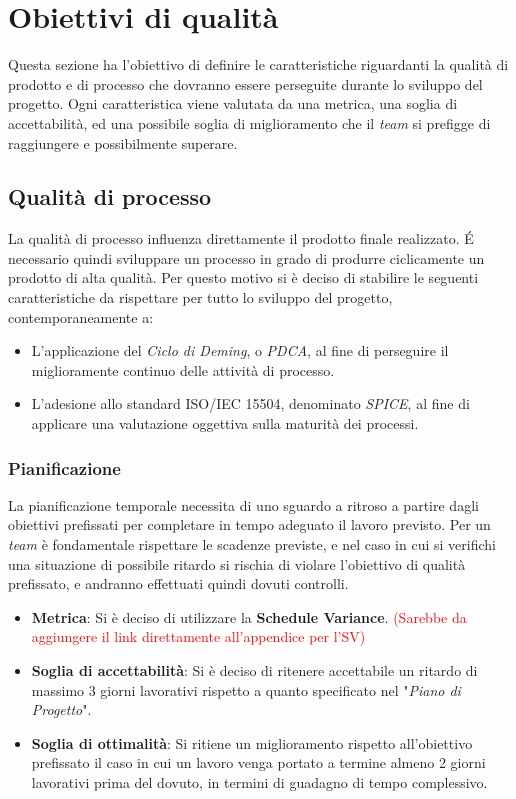 \section{Obiettivi di qualità}
Questa sezione ha l'obiettivo di definire le caratteristiche riguardanti la qualità di prodotto e di processo che dovranno essere perseguite durante lo sviluppo del progetto.
Ogni caratteristica viene valutata da una metrica, una soglia di accettabilità, ed una possibile soglia di miglioramento che il \emph{team} si prefigge di raggiungere e possibilmente superare.

\subsection{Qualità di processo}
La qualità di processo influenza direttamente il prodotto finale realizzato. É necessario quindi sviluppare un processo in grado di produrre ciclicamente un prodotto di alta qualità. Per questo motivo si è deciso di stabilire le seguenti caratteristiche da rispettare per tutto lo sviluppo del progetto, contemporaneamente a:
\begin{itemize}
\item L'applicazione del \emph{Ciclo di Deming}, o \emph{PDCA}, al fine di perseguire il miglioramente continuo delle attività di processo.
\item L'adesione allo standard ISO/IEC 15504, denominato \emph{SPICE}, al fine di applicare una valutazione oggettiva sulla maturità dei processi.
\end{itemize} 

\subsubsection{Pianificazione}
La pianificazione temporale necessita di uno sguardo a ritroso a partire dagli obiettivi prefissati per completare in tempo adeguato il lavoro previsto. Per un \emph{team} è fondamentale rispettare le scadenze previste, e nel caso in cui si verifichi una situazione di possibile ritardo si rischia di violare l'obiettivo di qualità prefissato, e andranno effettuati quindi dovuti controlli.
\begin{itemize}
	\item \textbf{Metrica}: Si è deciso di utilizzare la \textbf{Schedule Variance}. \textcolor{red}{(Sarebbe da aggiungere il link direttamente all'appendice per l'SV)}
	\item \textbf{Soglia di accettabilità}: Si è deciso di ritenere accettabile un ritardo di massimo 3 giorni lavorativi rispetto a quanto specificato nel "\emph{Piano di Progetto}".
	\item \textbf{Soglia di ottimalità}: Si ritiene un miglioramento rispetto all'obiettivo prefissato il caso in cui un lavoro venga portato a termine almeno 2 giorni lavorativi prima del dovuto, in termini di guadagno di tempo complessivo.
\end{itemize}

